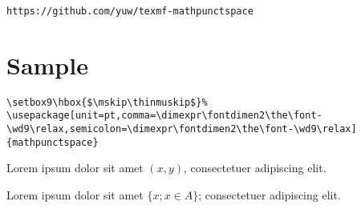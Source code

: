 \documentclass{article}
\begin{document}
\texttt{https://github.com/yuw/texmf-mathpunctspace}

\section{Sample}

\begin{verbatim}
\setbox9\hbox{$\mskip\thinmuskip$}%
\usepackage[unit=pt,comma=\dimexpr\fontdimen2\the\font-\wd9\relax,semicolon=\dimexpr\fontdimen2\the\font-\wd9\relax]{mathpunctspace}
\end{verbatim}

Lorem ipsum dolor sit amet $(x, y)$, consectetuer adipiscing elit.

Lorem ipsum dolor sit amet $\{x; x \in A\}$; consectetuer adipiscing elit.
\end{document}
